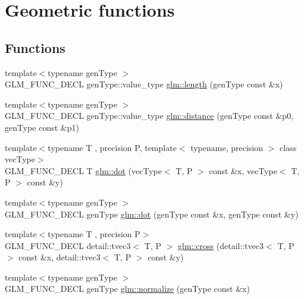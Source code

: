 \hypertarget{group__core__func__geometric}{}\section{Geometric functions}
\label{group__core__func__geometric}
\subsection*{Functions}
\begin{DoxyCompactItemize}
\item 
{\footnotesize template$<$typename gen\+Type $>$ }\\G\+L\+M\+\_\+\+F\+U\+N\+C\+\_\+\+D\+E\+CL gen\+Type\+::value\+\_\+type \hyperlink{group__core__func__geometric_ga03b2831439defb8922832b540b91b8a7}{glm\+::length} (gen\+Type const \&x)
\item 
{\footnotesize template$<$typename gen\+Type $>$ }\\G\+L\+M\+\_\+\+F\+U\+N\+C\+\_\+\+D\+E\+CL gen\+Type\+::value\+\_\+type \hyperlink{group__core__func__geometric_ga00716eae37e8ae2a76ca7799f9c75682}{glm\+::distance} (gen\+Type const \&p0, gen\+Type const \&p1)
\item 
{\footnotesize template$<$typename T , precision P, template$<$ typename, precision $>$ class vec\+Type$>$ }\\G\+L\+M\+\_\+\+F\+U\+N\+C\+\_\+\+D\+E\+CL T \hyperlink{group__core__func__geometric_ga7dada304da2ba7dd3376ab4f178c3f6b}{glm\+::dot} (vec\+Type$<$ T, P $>$ const \&x, vec\+Type$<$ T, P $>$ const \&y)
\item 
{\footnotesize template$<$typename gen\+Type $>$ }\\G\+L\+M\+\_\+\+F\+U\+N\+C\+\_\+\+D\+E\+CL gen\+Type \hyperlink{group__core__func__geometric_gaef767c2b0678489cb9de7a534137a86d}{glm\+::dot} (gen\+Type const \&x, gen\+Type const \&y)
\item 
{\footnotesize template$<$typename T , precision P$>$ }\\G\+L\+M\+\_\+\+F\+U\+N\+C\+\_\+\+D\+E\+CL detail\+::tvec3$<$ T, P $>$ \hyperlink{group__core__func__geometric_ga89b91c2a256cfb62ecbc589d1ee36d3c}{glm\+::cross} (detail\+::tvec3$<$ T, P $>$ const \&x, detail\+::tvec3$<$ T, P $>$ const \&y)
\item 
{\footnotesize template$<$typename gen\+Type $>$ }\\G\+L\+M\+\_\+\+F\+U\+N\+C\+\_\+\+D\+E\+CL gen\+Type \hyperlink{group__core__func__geometric_ga15aa87101457e41663b08a8dcc3357f8}{glm\+::normalize} (gen\+Type const \&x)

\end{DoxyCompactItemize}
